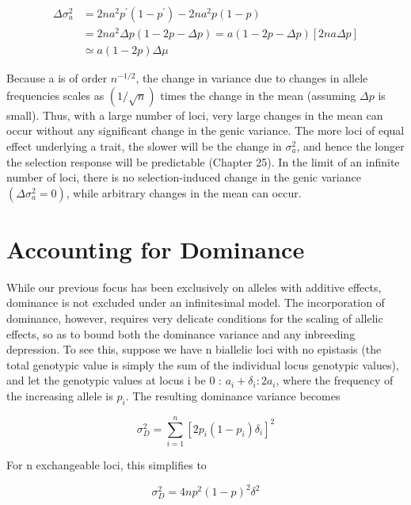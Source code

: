 \documentclass{article}
\begin{document}
\begin{equation}
\begin{aligned}\Delta\sigma_{a}^{2}&=2na^{2}p^{\prime}(1-p^{\prime})-2na^{2}p(1-p)\\&=2na^{2}\Delta p(1-2p-\Delta p)=a(1-2p-\Delta p)\left[2na\Delta p\right]\\&\simeq a\left(1-2p\right)\Delta\mu\end{aligned}
\end{equation}

Because a is of order  $ n^{-1/2} $, the change in variance due to changes in allele frequencies scales as  $ (1/\sqrt{n}) $ times the change in the mean (assuming  $ \Delta p $ is small). Thus, with a large number of loci, very large changes in the mean can occur without any significant change in the genic variance. The more loci of equal effect underlying a trait, the slower will be the change in  $ \sigma_a^2 $, and hence the longer the selection response will be predictable (Chapter 25). In the limit of an infinite number of loci, there is no selection-induced change in the genic variance  $ (\Delta \sigma_a^2 = 0) $, while arbitrary changes in the mean can occur.

\section{Accounting for Dominance}
While our previous focus has been exclusively on alleles with additive effects, dominance is not excluded under an infinitesimal model. The incorporation of dominance, however, requires very delicate conditions for the scaling of allelic effects, so as to bound both the dominance variance and any inbreeding depression. To see this, suppose we have n biallelic loci with no epistasis (the total genotypic value is simply the sum of the individual locus genotypic values), and let the genotypic values at locus i be 0 :  $ a_i + \delta_i : 2a_i $, where the frequency of the increasing allele is  $ p_i $. The resulting dominance variance becomes

\begin{equation}
\sigma_{D}^{2}=\sum_{i=1}^{n}\left[2p_{i}(1-p_{i})\delta_{i}\right]^{2}
\end{equation}

For n exchangeable loci, this simplifies to

\begin{equation}
\sigma_{D}^{2}=4n p^{2}(1-p)^{2}\delta^{2}
\end{equation}
\end{document}
